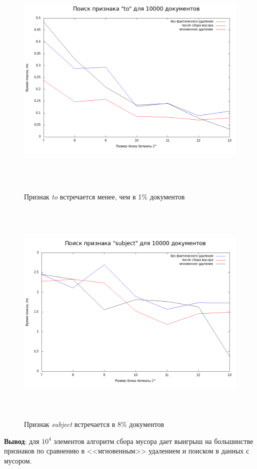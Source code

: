 \begin{figure}[H]
\includegraphics[width=\linewidth, height=11cm]{fig/limit_1e6/1e4/to_time.png}
\caption{Признак \textit{to} встречается менее, чем в 1\% документов}
\includegraphics[width=\linewidth, height=11cm]{fig/limit_1e6/1e4/subject_time.png}
\caption{Признак \textit{subject} встречается в 8\% документов}
\end{figure}

\textbf{Вывод}: для $10^4$ элементов алгоритм сбора мусора дает выигрыш на большинстве признаков
по сравнению в <<мгновенным>> удалением и поиском в данных с мусором.

